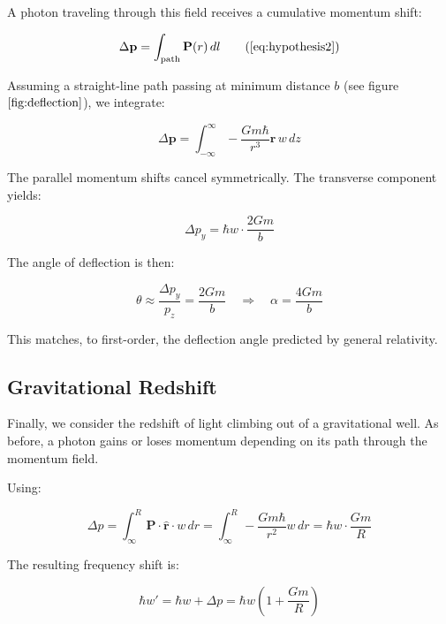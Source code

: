 \documentclass {article}
\renewcommand\vec{\mathbf}
\let\OldHat\hat
\renewcommand{\hat}[1]{\OldHat{\mathbf{#1}}}
\begin{document}
A photon traveling through this field receives a cumulative momentum shift:

\begin{equation}
\Delta \vec{p} = \int_{\text{path}} \vec{P}(r) \, dl
\tag{\ref{eq:hypothesis2}}
\end{equation}

Assuming a straight-line path passing at minimum distance \( b \) (see figure \(\ref{fig:deflection}\)), we integrate:

\begin{equation}
\Delta \vec{p} = \int_{-\infty}^{\infty} - \frac{G m \hbar}{r^3} \vec{r} \, w \, dz
\end{equation}

The parallel momentum shifts cancel symmetrically. The transverse component yields:

\begin{equation}
\Delta p_y = \hbar w \cdot \frac{2 G m}{b}
\end{equation}

The angle of deflection is then:

\begin{equation}
\theta \approx \frac{\Delta p_y}{p_z} = \frac{2 G m}{b} \quad \Rightarrow \quad \alpha = \frac{4 G m}{b}
\end{equation}

This matches, to first-order, the deflection angle predicted by general relativity.

\subsection{Gravitational Redshift}

Finally, we consider the redshift of light climbing out of a gravitational well. As before, a photon gains or loses momentum depending on its path through the momentum field.

Using:

\begin{equation}
\Delta p = \int_{\infty}^{R} \vec{P} \cdot \hat{r} \cdot w \, dr = \int_{\infty}^{R} - \frac{G m \hbar}{r^2} w \, dr = \hbar w \cdot \frac{G m}{R}
\end{equation}

The resulting frequency shift is:

\begin{equation}
\hbar w' = \hbar w + \Delta p = \hbar w \left( 1 + \frac{G m}{R} \right)
\end{equation}
\end{document}
